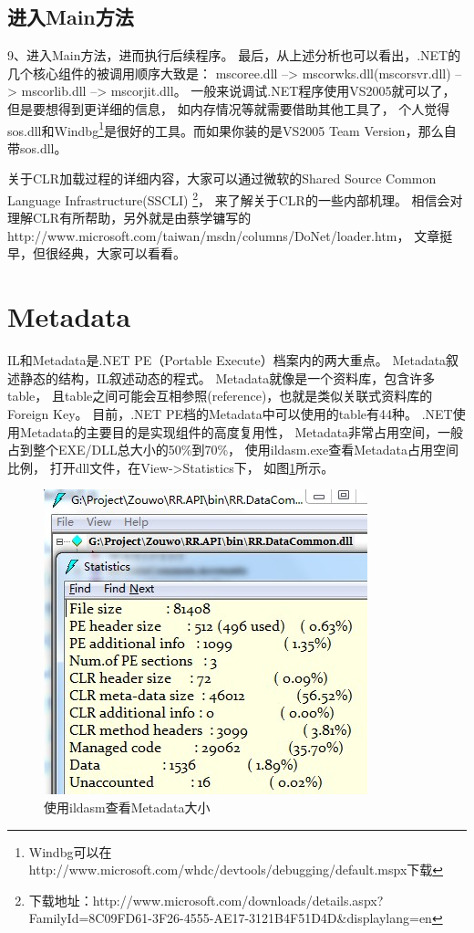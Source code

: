 \documentclass{book}
\begin{document}
\subsection{进入Main方法}

9、进入Main方法，进而执行后续程序。
最后，从上述分析也可以看出，.NET的几个核心组件的被调用顺序大致是： 
mscoree.dll --> mscorwks.dll(mscorsvr.dll) --> 
 mscorlib.dll --> mscorjit.dll。
一般来说调试.NET程序使用VS2005就可以了，但是要想得到更详细的信息，
如内存情况等就需要借助其他工具了，
个人觉得sos.dll和Windbg\footnote{Windbg可以在http://www.microsoft.com/whdc/devtools/debugging/default.mspx下载}是很好的工具。而如果你装的是VS2005 Team Version，那么自带sos.dll。

关于CLR加载过程的详细内容，大家可以通过微软的Shared Source Common Language Infrastructure(SSCLI)
\footnote{下载地址：http://www.microsoft.com/downloads/details.aspx?FamilyId=8C09FD61-3F26-4555-AE17-3121B4F51D4D\&displaylang=en}，
来了解关于CLR的一些内部机理。
相信会对理解CLR有所帮助，另外就是由蔡学镛写的http://www.microsoft.com/taiwan/msdn/columns/DoNet/loader.htm，
文章挺早，但很经典，大家可以看看。

\section{Metadata}

IL和Metadata是.NET PE（Portable Execute）档案内的两大重点。
Metadata叙述静态的结构，IL叙述动态的程式\cite{Metadata的格式和意义}。
Metadata就像是一个资料库，包含许多table，
且table之间可能会互相参照(reference)，也就是类似关联式资料库的Foreign Key。
目前，.NET PE档的Metadata中可以使用的table有44种。
.NET使用Metadata的主要目的是实现组件的高度复用性，
Metadata非常占用空间，一般占到整个EXE/DLL总大小的50\%到70\%，
使用ildasm.exe查看Metadata占用空间比例，
打开dll文件，在View->Statistics下，
如图\ref{fig:TheSizeOfMetaData}所示。

\begin{figure}[htbp]
	\centering
	\includegraphics[scale=0.8]{TheSizeOfMetaData.jpg}
	\caption{使用ildasm查看Metadata大小}
	\label{fig:TheSizeOfMetaData}
\end{figure}
\end{document}
